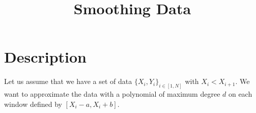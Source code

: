 \documentclass[aps,twocolumn]{revtex4}
\begin{document}
\title{Smoothing Data}
\maketitle

\section{Description}
Let us assume that we have a set of data $\lbrace X_i,Y_i\rbrace_{i\in[1,N]}$ with $X_i<X_{i+1}$.
We want to approximate the data with a polynomial of maximum degree $d$ on each window
defined by $[X_i-a,X_i+b]$.
\end{document}
